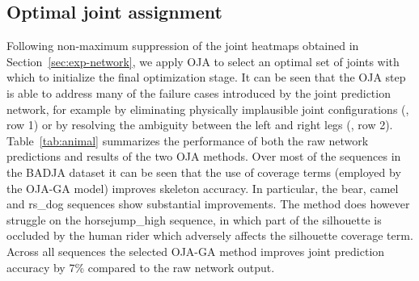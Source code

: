   \subsection{Optimal joint assignment}
  Following non-maximum suppression of the joint heatmaps obtained in Section~\ref{sec:exp-network}, we apply OJA to select an optimal set of joints with which to initialize the final optimization stage. It can be seen that the OJA step is able to address many of the failure cases introduced by the joint prediction network, for example by eliminating physically implausible joint configurations (, row 1) or by resolving the ambiguity between the left and right legs (, row 2).  Table~\ref{tab:animal} summarizes the performance of both the raw network predictions and results of the two OJA methods. Over most of the sequences in the BADJA dataset it can be seen that the use of coverage terms (employed by the OJA-GA model) improves skeleton accuracy. In particular, the bear, camel and rs\_dog sequences show substantial improvements. The method does however struggle on the horsejump\_high sequence, in which part of the silhouette is occluded by the human rider which adversely affects the silhouette coverage term. Across all sequences the selected OJA-GA method improves joint prediction accuracy by 7\% compared to the raw network output. 
  
